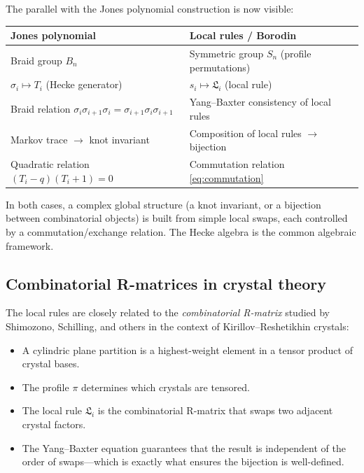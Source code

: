 \documentclass[12pt]{article}
\begin{document}
The parallel with the Jones polynomial construction is now visible:

\begin{center}
\begin{tabular}{ll}
\hline
\textbf{Jones polynomial} & \textbf{Local rules / Borodin} \\
\hline
Braid group $B_n$ & Symmetric group $S_n$ (profile permutations) \\
$\sigma_i \mapsto T_i$ (Hecke generator) & $s_i \mapsto \mathfrak{L}_i$ (local rule) \\
Braid relation $\sigma_i\sigma_{i+1}\sigma_i = \sigma_{i+1}\sigma_i\sigma_{i+1}$ & Yang--Baxter consistency of local rules \\
Markov trace $\to$ knot invariant & Composition of local rules $\to$ bijection \\
Quadratic relation $(T_i - q)(T_i + 1) = 0$ & Commutation relation \eqref{eq:commutation} \\
\hline
\end{tabular}
\end{center}

In both cases, a complex global structure (a knot invariant, or a bijection
between combinatorial objects) is built from simple local swaps, each
controlled by a commutation/exchange relation. The Hecke algebra is the
common algebraic framework.

\subsection{Combinatorial R-matrices in crystal theory}

The local rules are closely related to the \emph{combinatorial R-matrix}
studied by Shimozono, Schilling, and others in the context of
Kirillov--Reshetikhin crystals:
\begin{itemize}
  \item A cylindric plane partition is a highest-weight element in a tensor
    product of crystal bases.
  \item The profile $\pi$ determines which crystals are tensored.
  \item The local rule $\mathfrak{L}_i$ is the combinatorial R-matrix that
    swaps two adjacent crystal factors.
  \item The Yang--Baxter equation guarantees that the result is independent
    of the order of swaps---which is exactly what ensures the bijection is
    well-defined.
\end{itemize}
\end{document}
